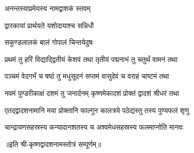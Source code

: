 
{अनन्तस्याप्रमेयस्य नामद्वाशकं स्तवम्}

{द्वारकायां प्रार्थयते यशोदायाश्च सन्निधौ}

{सकुण्डलालकं बालं गोपालं चिन्तयेदुषः}

\twolineshloka
{प्रथमं तु हरिं विद्याद्द्वितीयं केशवं तथा}
{तृतीयं पद्मनाभं तु चतुर्थं वामनं तथा}%

\twolineshloka
{पञ्चमं वेदगर्भं च षष्ठं तु मधुसूदनं}
{सप्तमं वासुदेवं च वराहं चाष्टमं तथा}%

\twolineshloka
{नवमं पुण्डरीकाक्षं दशमं तु जनार्दनम्}
{कृष्णमेकादशं प्रोक्तं द्वादशं श्रीधरं तथा}%

\twolineshloka
{एतद्द्वादशनामानि मया प्रोक्तानि फाल्गुन}
{कालत्रये पठेद्यस्तु तस्य पुण्यफलं शृणु}%

\twolineshloka
{चान्द्रायणसहस्रस्य कन्यादानशतस्य च}
{अश्वमेधसहस्रस्य फलमाप्नोति मानवः}%

॥इति श्री-कृष्णद्वादशनामस्तोत्रं सम्पूर्णम्‌॥
